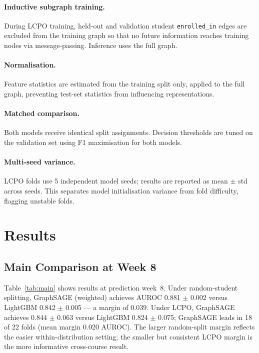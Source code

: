 \documentclass[sigconf,review]{acmart}
\newcommand{\todo}[1]{\textcolor{red}{\textbf{[TODO: #1]}}}
\newcommand{\fullrun}[1]{#1}  %
\begin{document}
\paragraph{Inductive subgraph training.}
During LCPO training, held-out and validation student \texttt{enrolled\_in}
edges are excluded from the training graph so that no future information
reaches training nodes via message-passing.  Inference uses the full graph.

\paragraph{Normalisation.}
Feature statistics are estimated from the training split only, applied to the
full graph, preventing test-set statistics from influencing representations.

\paragraph{Matched comparison.}
Both models receive identical split assignments.  Decision thresholds are
tuned on the validation set using F1 maximisation for both models.

\paragraph{Multi-seed variance.}
LCPO folds use 5 independent model seeds; results are reported as
mean $\pm$ std across seeds.  This separates model initialisation variance
from fold difficulty, flagging unstable folds.

\section{Results}
\label{sec:results}

\subsection{Main Comparison at Week 8}
\label{sec:main}

Table~\ref{tab:main} shows results at prediction week~8.  Under random-student
splitting, GraphSAGE (weighted) achieves AUROC \fullrun{0.881 $\pm$ 0.002}
versus LightGBM \fullrun{0.842 $\pm$ 0.005} --- a margin of
\fullrun{0.039}.  Under LCPO, GraphSAGE achieves \fullrun{0.844 $\pm$ 0.063}
versus LightGBM \fullrun{0.824 $\pm$ 0.075}; GraphSAGE leads in
\fullrun{18 of 22} folds (mean margin \fullrun{0.020} AUROC).  The larger
random-split margin reflects the easier within-distribution setting; the
smaller but consistent LCPO margin is the more informative cross-course
result.
\end{document}
